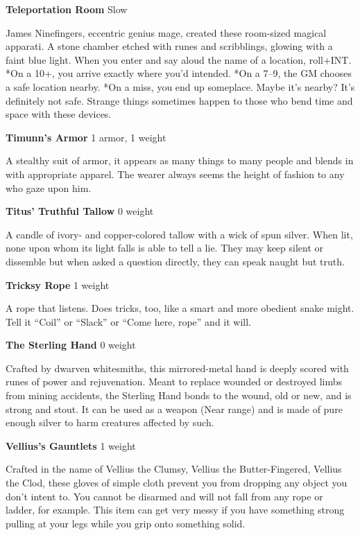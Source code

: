 {\noindent \bfseries Teleportation Room} \hspace*{\fill} Slow

James Ninefingers, eccentric genius mage, created these room-sized magical apparati. A stone chamber etched with runes and scribblings, glowing with a faint blue light. When you enter and say aloud the name of a location, roll+INT. *On a 10+, you arrive exactly where you'd intended. *On a 7--9, the GM chooses a safe location nearby. *On a miss, you end up someplace. Maybe it's nearby? It's definitely not safe. Strange things sometimes happen to those who bend time and space with these devices.

{\noindent \bfseries Timunn's Armor} \hspace*{\fill} 1 armor, 1 weight

A stealthy suit of armor, it appears as many things to many people and blends in with appropriate apparel. The wearer always seems the height of fashion to any who gaze upon him.

{\noindent \bfseries Titus' Truthful Tallow} \hspace*{\fill} 0 weight

A candle of ivory- and copper-colored tallow with a wick of spun silver. When lit, none upon whom its light falls is able to tell a lie. They may keep silent or dissemble but when asked a question directly, they can speak naught but truth.

{\noindent \bfseries Tricksy Rope} \hspace*{\fill} 1 weight

A rope that listens. Does tricks, too, like a smart and more obedient snake might. Tell it ``Coil'' or ``Slack'' or ``Come here, rope'' and it will. 

{\noindent \bfseries The Sterling Hand} \hspace*{\fill} 0 weight

Crafted by dwarven whitesmiths, this mirrored-metal hand is deeply scored with runes of power and rejuvenation. Meant to replace wounded or destroyed limbs from mining accidents, the Sterling Hand bonds to the wound, old or new, and is strong and stout. It can be used as a weapon (Near range) and is made of pure enough silver to harm creatures affected by such.

{\noindent \bfseries Vellius's Gauntlets} \hspace*{\fill} 1 weight

Crafted in the name of Vellius the Clumsy, Vellius the Butter-Fingered, Vellius the Clod, these gloves of simple cloth prevent you from dropping any object you don't intent to. You cannot be disarmed and will not fall from any rope or ladder, for example. This item can get very messy if you have something strong pulling at your legs while you grip onto something solid.

